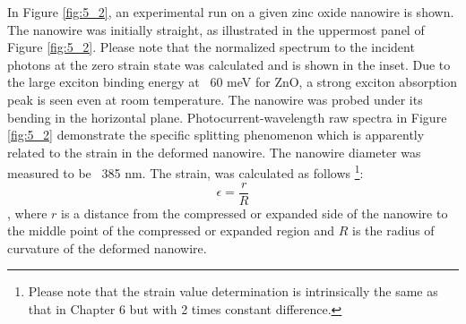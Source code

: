 In Figure \ref{fig:5_2}, an experimental run on a given zinc oxide nanowire is shown. The nanowire was initially straight, as illustrated in the uppermost panel of Figure \ref{fig:5_2}. 
Please note that the normalized spectrum to the incident photons at the zero strain state was calculated and is shown in the inset. 
Due to the large exciton binding energy at ~60 meV for ZnO, a strong exciton absorption peak is seen even at room temperature. 
The nanowire was probed under its bending in the horizontal plane. 
Photocurrent-wavelength raw spectra in Figure \ref{fig:5_2} demonstrate the specific splitting phenomenon which is apparently related to the strain in the deformed nanowire. 
The nanowire diameter was measured to be ~385 nm. 
The strain, was calculated as follows \footnote{Please note that the strain value determination is intrinsically the same as that in  Chapter 6 but with  2 times constant difference.}: $$\epsilon = \frac{r}{R} $$
, where $r$ is a distance from the compressed or expanded side of the nanowire to the middle point of the compressed or expanded region and $R$ is the radius of curvature of the deformed nanowire. \\

